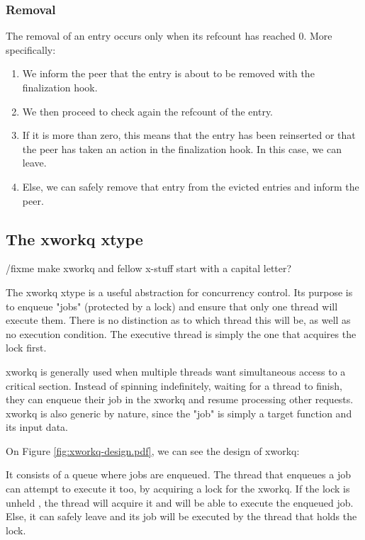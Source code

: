 \subsubsection{Removal}

The removal of an entry occurs only when its refcount has reached 0. More 
specifically:

\begin{enumerate}
	\item We inform the peer that the entry is about to be removed with the
		finalization hook.
	\item We then proceed to check again the refcount of the entry.
	\item If it is more than zero, this means that the entry has been 
		reinserted or that the peer has taken an action in the 
		finalization hook. In this case, we can leave.
	\item Else, we can safely remove that entry from the evicted entries and 
		inform the peer.
\end{enumerate}

\subsection{The xworkq xtype}\label{sec:xworkq-design}

/fixme make xworkq and fellow x-stuff start with a capital letter?

The xworkq xtype is a useful abstraction for concurrency control. Its purpose 
is to enqueue "jobs" (protected by a lock) and ensure that only one thread will 
execute them. There is no distinction as to which thread this will be, as well 
as no execution condition. The executive thread is simply the one that acquires 
the lock first.

xworkq is generally used when multiple threads want simultaneous access to a 
critical section. Instead of spinning indefinitely, waiting for a thread to 
finish, they can enqueue their job in the xworkq and resume processing other 
requests. xworkq is also generic by nature, since the "job" is simply a target 
function and its input data.

On Figure \ref{fig:xworkq-design.pdf}, we can see the design of xworkq:


It consists of a queue where jobs are enqueued.  The thread that enqueues a job 
can attempt to execute it too, by acquiring a lock for the xworkq. If the lock 
is unheld%
, the thread will acquire it and will be able to execute the enqueued job.  
Else, it can safely leave and its job will be executed by the thread that holds 
the lock.

